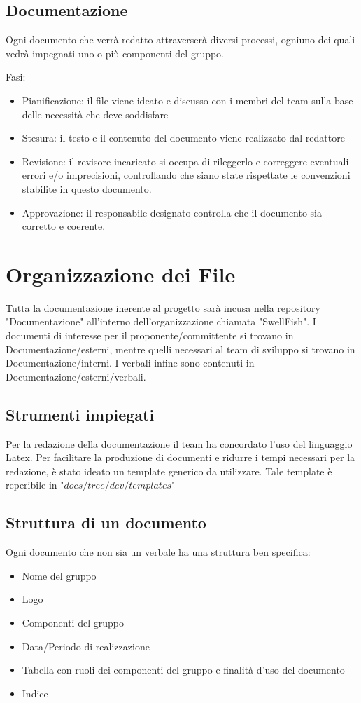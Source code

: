 \documentclass[12pt]{article}
\begin{document}
\subsection{Documentazione}
Ogni documento che verrà redatto attraverserà diversi processi, ogniuno dei quali vedrà impegnati uno o più componenti del gruppo.

Fasi:
\begin{itemize}
    \item Pianificazione: il file viene ideato e discusso con i membri del team sulla base delle necessità che deve soddisfare
    \item Stesura: il testo e il contenuto del documento viene realizzato dal redattore
    \item Revisione: il revisore incaricato si occupa di rileggerlo e correggere eventuali errori e/o imprecisioni, controllando che siano state rispettate le convenzioni stabilite in questo documento.
    \item Approvazione: il responsabile designato controlla che il documento sia corretto e coerente.
\end{itemize}
\section{Organizzazione dei File}
Tutta la documentazione inerente al progetto sarà incusa nella repository "Documentazione" all'interno dell'organizzazione chiamata "SwellFish".
I documenti di interesse per il proponente/committente si trovano in Documentazione/esterni, mentre quelli necessari al team di sviluppo si trovano in Documentazione/interni. I verbali infine sono contenuti in Documentazione/esterni/verbali.
\subsection{Strumenti impiegati}
Per la redazione della documentazione il team ha concordato l'uso del linguaggio Latex.
Per facilitare la produzione di documenti e ridurre i tempi necessari per la redazione, è stato ideato un template generico da utilizzare.
Tale template è reperibile in "$docs/tree/dev/templates$"
\subsection{Struttura di un documento}
Ogni documento che non sia un verbale ha una struttura ben specifica:
\begin{itemize}
    \item Nome del gruppo
    \item Logo 
    \item Componenti del gruppo
    \item Data/Periodo di realizzazione
    \item Tabella con ruoli dei componenti del gruppo e finalità d'uso del documento
    \item Indice
\end{itemize}
\end{document}
